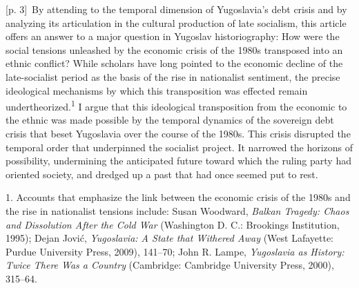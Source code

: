 \documentclass[10pt,a4paper]{article}
\begin{document}
{\scriptsize\color{gray} [p. 3]}\ By attending to the temporal dimension of Yugoslavia’s debt crisis and by analyzing its articulation in the cultural production of late socialism, this article offers an answer to a major question in Yugoslav historiography: How were the social tensions unleashed by the economic crisis of the 1980s transposed into an ethnic conflict? While scholars have long pointed to the economic decline of the late-socialist period as the basis of the rise in nationalist sentiment, the precise ideological mechanisms by which this transposition was effected remain undertheorized.\nobreak\textsuperscript{1} I argue that this ideological transposition from the economic to the ethnic was made possible by the temporal dynamics of the sovereign debt crisis that beset Yugoslavia over the course of the 1980s. This crisis disrupted the temporal order that underpinned the socialist project. It narrowed the horizons of possibility, undermining the anticipated future toward which the ruling party had oriented society, and dredged up a past that had once seemed put to rest.\par{\small 1. Accounts that emphasize the link between the economic crisis of the 1980s and the rise in nationalist tensions include: Susan Woodward, \textit{Balkan Tragedy: Chaos and Dissolution After the Cold War} (Washington D. C.: Brookings Institution, 1995); Dejan Jović, \textit{Yugoslavia: A State that Withered Away} (West Lafayette: Purdue University Press, 2009), 141–70; John R. Lampe, \textit{Yugoslavia as History: Twice There Was a Country} (Cambridge: Cambridge University Press, 2000), 315–64.\par}
\end{document}
